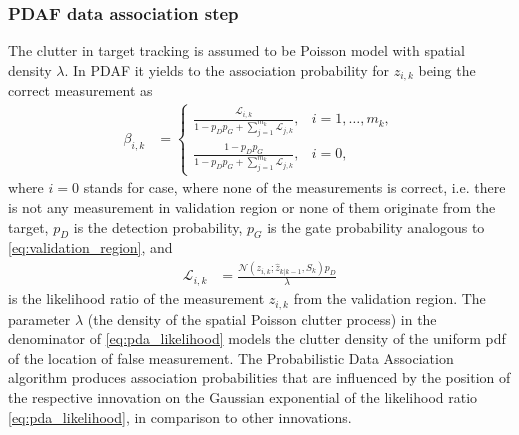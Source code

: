 \subsubsection{PDAF data association step}
The clutter in target tracking is assumed to be Poisson model with spatial density $\lambda$. In PDAF it yields to the association probability for $z_{i,k}$ being the correct measurement as
\begin{align}
    \beta_{i,k} &=
    \begin{cases}
        {\frac{\displaystyle\mathcal{L}_{i,k}}{\displaystyle 1-p_D p_G + \sum_{j=1}^{m_k}\mathcal{L}_{j,k}}}, & i=1, \dots, m_k, \\
        {\frac{\displaystyle 1-p_D p_G}{\displaystyle 1-p_D p_G + \sum_{j=1}^{m_k}\mathcal{L}_{j,k}}}, & i =0,
    \end{cases}
    \label{eq:pda_beta}
\end{align}
where $i=0$ stands for case, where none of the measurements is correct, i.e. there is not any measurement in
validation region or none of them originate from the target, $p_D$ is the detection probability, $p_G$ is
the gate
probability
analogous to \eqref{eq:validation_region}, and
\begin{align}
    \mathcal{L}_{i,k} &= \frac{\mathcal{N}(z_{i,k};\hat{z}_{k|k-1}, S_k) p_D}{\lambda} \label{eq:pda_likelihood}
\end{align}
is the likelihood ratio of the measurement $z_{i,k}$ from the validation region. The parameter $\lambda$ (the density
of the spatial Poisson clutter process) in the denominator of \eqref{eq:pda_likelihood} models the clutter density of
the uniform pdf of the location of false measurement. The Probabilistic Data Association algorithm produces association probabilities that are influenced by the position of the respective innovation on the Gaussian exponential of the likelihood ratio \eqref{eq:pda_likelihood}, in comparison to other innovations.


